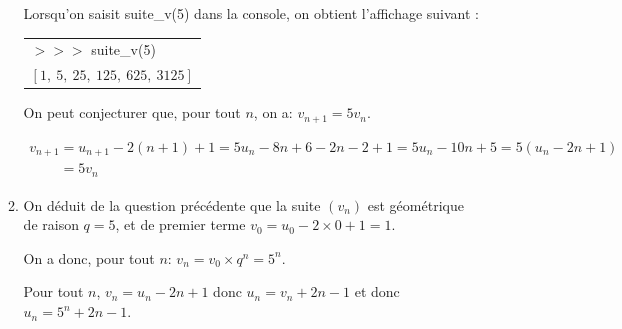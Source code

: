 \begin{enumerate}
\begin{enumerate}
Lorsqu'on saisit {\ttfamily suite\_v(5)} dans la console, on obtient l'affichage suivant :

\begin{center}
\begin{tabular}{>{\ttfamily} l}
$>>>$ suite\_v(5)\\
$[1,~5,~25,~125,~625,~3125]$\\
\end{tabular}
\end{center}



On peut conjecturer que, pour tout $n$, on a: $v_{n+1}=5v_n$.



$\begin{gathered}v_{n+1}=u_{n+1}-2(n+1)+1 = 5u_n -8n +6 -2n-2+1=5u_n-10n+5= 5(u_n-2n+1)\\
\phantom{v_{n+1}}
=5v_n\end{gathered}$

		\item 
On déduit de la question précédente que  la suite $(v_n)$ est géométrique de raison $q=5$, et de premier terme $v_0=u_0-2\times 0+1=1$. 

On a donc, pour tout $n$: $v_n = v_0\times q^n = 5^n$.

Pour tout $n$, $v_n=u_n-2n+1$ donc $u_n=v_n+2n-1$ et donc $u_n= 5^n +2n-1$.
	\end{enumerate}
\end{enumerate}

\bigskip
